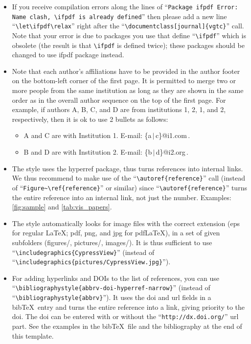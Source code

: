 \documentclass[review,journal]{vgtc}         %
\begin{document}
\begin{itemize}
\item If you receive compilation errors along the lines of ``\texttt{Package ifpdf Error: Name clash, \textbackslash ifpdf is already defined}'' then please add a new line ``\texttt{\textbackslash let\textbackslash ifpdf\textbackslash relax}'' right after the ``\texttt{\textbackslash documentclass[journal]\{vgtc\}}'' call. Note that your error is due to packages you use that define ``\texttt{\textbackslash ifpdf}'' which is obsolete (the result is that \texttt{\textbackslash ifpdf} is defined twice); these packages should be changed to use ifpdf package instead.
\item Note that each author's affiliations have to be provided in the author footer on the bottom-left corner of the first page. It is permitted to merge two or more people from the same institution as long as they are shown in the same order as in the overall author sequence on the top of the first page. For example, if authors A, B, C, and D are from institutions 1, 2, 1, and 2, respectively, then it is ok to use 2 bullets as follows:
\begin{itemize}
\item A and C are with Institution 1. E-mail: \{a\,$|$\,c\}@i1.com\,.
\item B and D are with Institution 2. E-mail: \{b\,$|$\,d\}@i2.org\,.
\end{itemize}
\item The style uses the hyperref package, thus turns references into internal links. We thus recommend to make use of the ``\texttt{\textbackslash autoref\{reference\}}'' call (instead of ``\texttt{Figure\~{}\textbackslash ref\{reference\}}'' or similar) since ``\texttt{\textbackslash autoref\{reference\}}'' turns the entire reference into an internal link, not just the number. Examples: \autoref{fig:sample} and \autoref{tab:vis_papers}.
\item The style automatically looks for image files with the correct extension (eps for regular \LaTeX; pdf, png, and jpg for pdf\LaTeX), in a set of given subfolders (figures/, pictures/, images/). It is thus sufficient to use ``\texttt{\textbackslash includegraphics\{CypressView\}}'' (instead of ``\texttt{\textbackslash includegraphics\{pictures/CypressView.jpg\}}'').
\item For adding hyperlinks and DOIs to the list of references, you can use ``\texttt{\textbackslash bibliographystyle\{abbrv-doi-hyperref-narrow\}}'' (instead of ``\texttt{\textbackslash bibliographystyle\{abbrv\}}''). It uses the doi and url fields in a bib\TeX\ entry and turns the entire reference into a link, giving priority to the doi. The doi can be entered with or without the ``\texttt{http://dx.doi.org/}'' url part. See the examples in the bib\TeX\ file and the bibliography at the end of this template.\\[1em]

\end{itemize}
\end{document}

